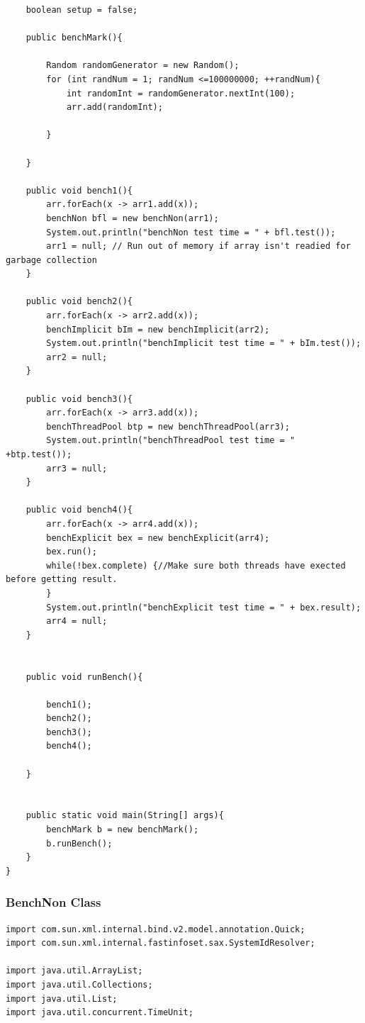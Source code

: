 \documentclass[10pt]{article}  %
\theoremstyle{definition}
\theoremstyle{remark}
\begin{document}
\begin{appendices}
\begin{lstlisting}
    boolean setup = false;

    public benchMark(){

        Random randomGenerator = new Random();
        for (int randNum = 1; randNum <=100000000; ++randNum){
            int randomInt = randomGenerator.nextInt(100);
            arr.add(randomInt);
           
        }

    }
 
    public void bench1(){
        arr.forEach(x -> arr1.add(x));
        benchNon bfl = new benchNon(arr1);
        System.out.println("benchNon test time = " + bfl.test());
        arr1 = null; // Run out of memory if array isn't readied for garbage collection
    }

    public void bench2(){
        arr.forEach(x -> arr2.add(x));
        benchImplicit bIm = new benchImplicit(arr2);
        System.out.println("benchImplicit test time = " + bIm.test());
        arr2 = null;
    }

    public void bench3(){
        arr.forEach(x -> arr3.add(x));
        benchThreadPool btp = new benchThreadPool(arr3);
        System.out.println("benchThreadPool test time = " +btp.test());
        arr3 = null;
    }

    public void bench4(){
        arr.forEach(x -> arr4.add(x));
        benchExplicit bex = new benchExplicit(arr4);
        bex.run();
        while(!bex.complete) {//Make sure both threads have exected before getting result.
        }
        System.out.println("benchExplicit test time = " + bex.result);
        arr4 = null;
    }


    public void runBench(){

        bench1();
        bench2();
        bench3();
        bench4();

    }


    public static void main(String[] args){
        benchMark b = new benchMark();
        b.runBench();
    }
}

\end{lstlisting}
\newpage
\subsubsection{BenchNon Class}\label{benchNon} 
  \begin{lstlisting}
import com.sun.xml.internal.bind.v2.model.annotation.Quick;
import com.sun.xml.internal.fastinfoset.sax.SystemIdResolver;

import java.util.ArrayList;
import java.util.Collections;
import java.util.List;
import java.util.concurrent.TimeUnit;


\end{lstlisting}
\end{appendices}
\end{document}
